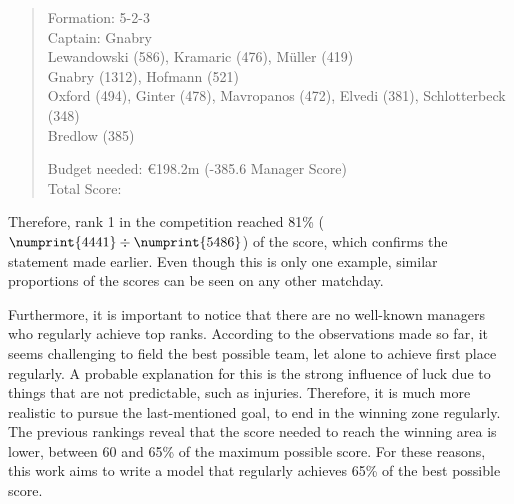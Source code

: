 \begin{quote}
    \centering
    Formation:  5-2-3 \\
    Captain:    Gnabry \\

    Lewandowski (586), Kramaric (476), Müller (419) \\
    Gnabry (1312), Hofmann (521) \\
    Oxford (494), Ginter (478), Mavropanos (472), Elvedi (381), Schlotterbeck (348) \\
    Bredlow (385)

    Budget needed: €198.2m (-385.6 Manager Score) \\
    Total Score: \textbf{}
\end{quote}

Therefore, rank 1 in the competition reached 81\% ($\numprint{4441} \div \numprint{5486}$) of the score, which confirms the statement made earlier. Even though this is only one example, similar proportions of the scores can be seen on any other matchday.

Furthermore, it is important to notice that there are no well-known managers who regularly achieve top ranks. According to the observations made so far, it seems challenging to field the best possible team, let alone to achieve first place regularly. A probable explanation for this is the strong influence of luck due to things that are not predictable, such as injuries. Therefore, it is much more realistic to pursue the last-mentioned goal, to end in the winning zone regularly. The previous rankings reveal that the score needed to reach the winning area is lower, between 60 and 65\% of the maximum possible score. For these reasons, this work aims to write a model that regularly achieves 65\% of the best possible score.

